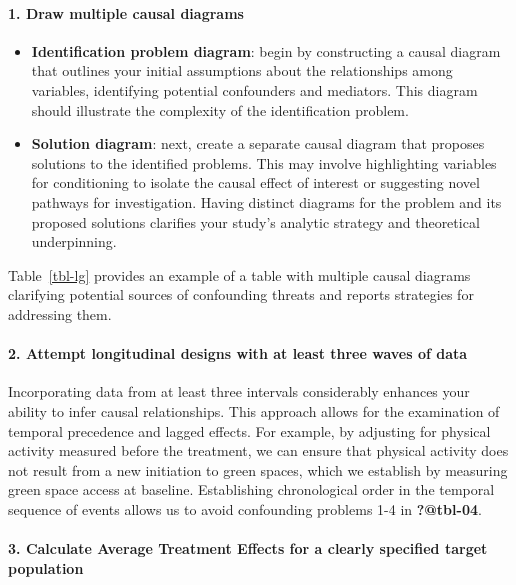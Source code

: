 \documentclass[
  single column]{article}
\let\oldparagraph\paragraph
\renewcommand{\paragraph}[1]{\oldparagraph{#1}\mbox{}}
\providecommand{\tightlist}{%
  \setlength{\itemsep}{0pt}\setlength{\parskip}{0pt}}\usepackage{longtable,booktabs,array}
\begin{document}
\paragraph{1. Draw multiple causal
diagrams}\label{draw-multiple-causal-diagrams-1}

\begin{itemize}
\tightlist
\item
  \textbf{Identification problem diagram}: begin by constructing a
  causal diagram that outlines your initial assumptions about the
  relationships among variables, identifying potential confounders and
  mediators. This diagram should illustrate the complexity of the
  identification problem.
\item
  \textbf{Solution diagram}: next, create a separate causal diagram that
  proposes solutions to the identified problems. This may involve
  highlighting variables for conditioning to isolate the causal effect
  of interest or suggesting novel pathways for investigation. Having
  distinct diagrams for the problem and its proposed solutions clarifies
  your study's analytic strategy and theoretical underpinning.
\end{itemize}

Table~\ref{tbl-lg} provides an example of a table with multiple causal
diagrams clarifying potential sources of confounding threats and reports
strategies for addressing them.

\paragraph{2. Attempt longitudinal designs with at least three waves of
data}\label{attempt-longitudinal-designs-with-at-least-three-waves-of-data}

Incorporating data from at least three intervals considerably enhances
your ability to infer causal relationships. This approach allows for the
examination of temporal precedence and lagged effects. For example, by
adjusting for physical activity measured before the treatment, we can
ensure that physical activity does not result from a new initiation to
green spaces, which we establish by measuring green space access at
baseline. Establishing chronological order in the temporal sequence of
events allows us to avoid confounding problems 1-4 in \textbf{?@tbl-04}.

\paragraph{3. Calculate Average Treatment Effects for a clearly
specified target
population}\label{calculate-average-treatment-effects-for-a-clearly-specified-target-population}
\end{document}
